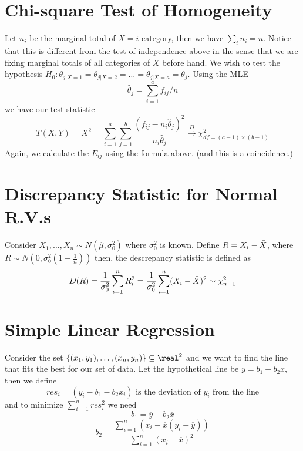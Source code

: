 \documentclass{article}
\begin{document}
\section{Chi-square Test of Homogeneity}
Let $n_i$ be the marginal total of $X=i$ category, then we have $\sum_i n_i = n$. Notice that this is different
from the test of independence above in the sense that we are fixing marginal totals of all categories of $X$ before hand.
We wish to test the hypothesis $H_0: \theta_{j|X=1} = \theta_{j|X=2} =\ldots= \theta_{j|X=a} = \theta_j$. Using the MLE
\begin{equation*}
    \hat{\theta}_j = \sum_{i=1}^a f_{ij}/n
\end{equation*}
we have our test statistic
\begin{equation*}
    T(X,Y) = X^2 = \sum_{i=1}^a\sum_{j=1}^b \frac{\left(f_{ij} - n_i\hat{\theta}_{j}\right)^2}{n_i\hat{\theta}_{j}} \xrightarrow{D} \chi^2_{df=(a-1)\times(b-1)}
\end{equation*}
Again, we calculate the $E_{ij}$ using the formula above. (and this is a coincidence.)


\section{Discrepancy Statistic for Normal R.V.s}
Consider $X_1,\ldots,X_n\sim N(\hat{\mu}, \sigma_0^2)$ where $\sigma_0^2$ is known. Define $R = X_i - \Bar{X}$, where $R\sim N(0, \sigma_0^2 (1 - \frac{1}{n}))$ then, the descrepancy statistic is defined as
\begin{equation*}
    D(R) = \frac{1}{\sigma_0^2}\sum_{i = 1}^n R_i^2 =  \frac{1}{\sigma_0^2}\sum_{i=1}^n(X_i - \Bar{X})^2 \sim \chi^2_{n-1}
\end{equation*}

\section{Simple Linear Regression}
Consider the set $\{ (x_1,y_1),\ldots,(x_n,y_n) \}\subseteq \real^2$ and we want to find the line that
fits the best for our set of data. Let the hypothetical line be $y = b_1 + b_2 x$, then we define
\begin{equation*}
    res_i = (y_i - b_1-b_2x_i)\,\,\text{is the deviation of $y_i$ from the line}
\end{equation*}
and to minimize $\sum_{i=1}^nres_i^2$ we need
\begin{equation*}
    b_1 = \overline{y} - b_2\overline{x}
\end{equation*}
\begin{equation*}
    b_2 = \frac{\sum_{i=1}^n(x_i - \overline{x}(y_i-\overbar{y}))}{\sum_{i=1}^n\left(x_i-\overbar{x}\right)^2}
\end{equation*}
\end{document}
